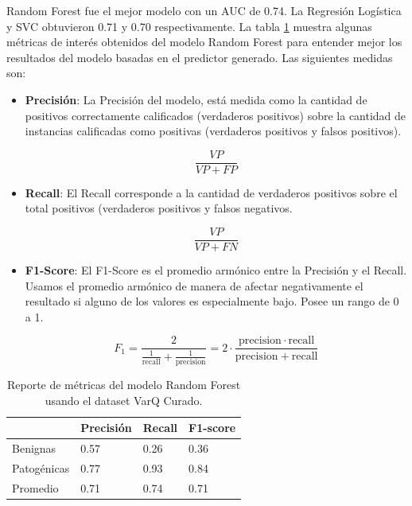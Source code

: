 Random Forest fue el mejor modelo con un AUC de 0.74. La Regresión Logística y SVC obtuvieron 0.71 y 0.70 respectivamente. La tabla \ref{tab:metrics_varq} muestra algunas métricas de interés obtenidos del modelo Random Forest para entender mejor los resultados del modelo basadas en el predictor generado. Las siguientes medidas son:

\begin{itemize}
    \item \textbf{Precisión}: La Precisión del modelo, está medida como la cantidad de positivos correctamente calificados (verdaderos positivos) sobre la cantidad de instancias calificadas como positivas (verdaderos positivos y falsos positivos).
    
    \begin{equation*}
        \frac{VP}{VP + FP}
    \end{equation*}
    
\pagebreak
    \item \textbf{Recall}: El Recall corresponde a la cantidad de verdaderos positivos sobre el total positivos (verdaderos positivos y falsos negativos.
    
    \begin{equation*}
        \frac{VP}{VP + FN}
    \end{equation*}
    
    \item \textbf{F1-Score}: El F1-Score es el promedio armónico entre la Precisión y el Recall. Usamos el promedio armónico de manera de afectar negativamente el resultado si alguno de los valores es especialmente bajo. Posee un rango de 0 a 1. 
    
    \begin{equation*}
        F_1 = \frac{2}{\tfrac{1}{\mathrm{recall}} + \tfrac{1}{\mathrm{precision}}} = 2 \cdot \frac{\mathrm{precision} \cdot \mathrm{recall}}{\mathrm{precision} + \mathrm{recall}}
    \end{equation*}
    
\end{itemize}

\begin{table}[H]
\centering
\begin{tabular}{|l|l|l|l|}
\hline
              & Precisión & Recall & F1-score \\ \hline
Benignas      & 0.57      & 0.26   & 0.36     \\ \hline
Patogénicas   & 0.77      & 0.93   & 0.84     \\ \hline
Promedio      & 0.71      & 0.74   & 0.71     \\ \hline
\end{tabular}
\caption{Reporte de métricas del modelo Random Forest usando el dataset VarQ Curado.}
\label{tab:metrics_varq}
\end{table}


